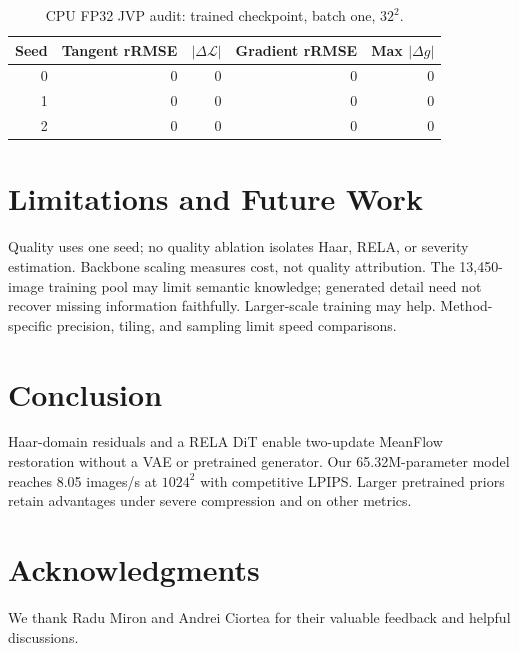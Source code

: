\documentclass[conference,letterpaper]{IEEEtran}
\begin{document}
\begin{table}[H]
\centering
\caption{CPU FP32 JVP audit: trained checkpoint, batch one, $32^2$.}
\label{tab:jvp}
\scriptsize
\setlength{\tabcolsep}{3pt}
\renewcommand{\arraystretch}{0.85}
\begin{tabular}{@{}rrrrr@{}}
\toprule
Seed & Tangent rRMSE & $|\Delta\mathcal L|$ & Gradient rRMSE & Max $|\Delta g|$\\
\midrule
0 &0&0&0&0\\
1 &0&0&0&0\\
2 &0&0&0&0\\
\bottomrule
\end{tabular}
\end{table}

\section{Limitations and Future Work}

Quality uses one seed; no quality ablation isolates Haar, RELA, or severity estimation. Backbone scaling measures cost, not quality attribution. The 13,450-image training pool may limit semantic knowledge; generated detail need not recover missing information faithfully. Larger-scale training may help. Method-specific precision, tiling, and sampling limit speed comparisons.

\section{Conclusion}

Haar-domain residuals and a RELA DiT enable two-update MeanFlow restoration without a VAE or pretrained generator. Our 65.32M-parameter model reaches 8.05 images/s at $1024^2$ with competitive LPIPS. Larger pretrained priors retain advantages under severe compression and on other metrics.

\section*{Acknowledgments}
We thank Radu Miron and Andrei Ciortea for their valuable feedback and helpful discussions. %


\end{document}
